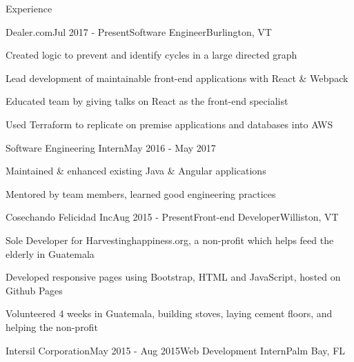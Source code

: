 \documentclass{resume} %
\begin{document}

\begin{rSection}{Experience}


\begin{rSubsection}{Dealer.com}{Jul 2017 - Present}{Software Engineer}{Burlington, VT}
\item Created logic to prevent and identify cycles in a large directed graph
\item Lead development of maintainable front-end applications with React \& Webpack
\item Educated team by giving talks on React as the front-end specialist
\item Used Terraform to replicate on premise applications and databases into AWS
\end{rSubsection}
\begin{sSubsection}{Software Engineering Intern}{May 2016 - May 2017}
\item Maintained \& enhanced existing Java \& Angular applications
\item Mentored by team members, learned good engineering practices
\end{sSubsection}

\begin{rSubsection}{Cosechando Felicidad Inc}{Aug 2015 - Present}{Front-end Developer}{Williston, VT}

\item Sole Developer for Harvestinghappiness.org, a non-profit which helps feed the elderly in Guatemala
\item Developed responsive pages using Bootstrap, HTML and JavaScript, hosted on Github Pages
\item Volunteered 4 weeks in Guatemala, building stoves, laying cement floors, and helping the non-profit

\end{rSubsection}


\begin{rSubsection}{Intersil Corporation}{May 2015 - Aug 2015}{Web Development Intern}{Palm Bay, FL}


\end{rSubsection}
\end{rSection}
\end{document}
